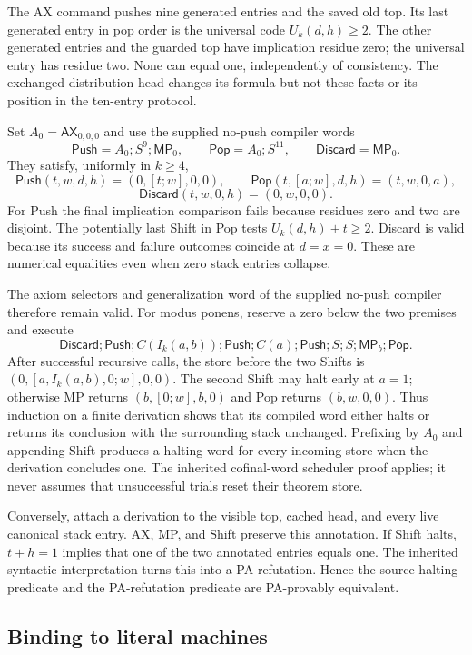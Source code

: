 The AX command pushes nine generated entries and the saved old top. Its last
generated entry in pop order is the universal code $U_k(d,h)\ge2$. The other
generated entries and the guarded top have implication residue zero; the
universal entry has residue two. None can equal one, independently of consistency.
The exchanged distribution head changes its formula but not these facts or its
position in the ten-entry protocol.

Set $A_0=\mathsf{AX}_{0,0,0}$ and use the supplied no-push compiler words
\[
 \mathsf{Push}=A_0;S^9;\mathsf{MP}_0,
 \qquad \mathsf{Pop}=A_0;S^{11},
 \qquad \mathsf{Discard}=\mathsf{MP}_0.
\]
They satisfy, uniformly in $k\ge4$,
\[
 \mathsf{Push}(t,w,d,h)=(0,[t;w],0,0),\qquad
 \mathsf{Pop}(t,[a;w],d,h)=(t,w,0,a),
\]
\[
 \mathsf{Discard}(t,w,0,h)=(0,w,0,0).
\]
For Push the final implication comparison fails because residues zero and two
are disjoint. The potentially last Shift in Pop tests $U_k(d,h)+t\ge2$.
Discard is valid because its success and failure outcomes coincide at $d=x=0$.
These are numerical equalities even when zero stack entries collapse.

The axiom selectors and generalization word of the supplied no-push compiler
therefore remain valid. For modus ponens, reserve a zero below the two premises
and execute
\[
 \mathsf{Discard};\mathsf{Push};C(I_k(a,b));\mathsf{Push};
 C(a);\mathsf{Push};S;S;\mathsf{MP}_b;\mathsf{Pop}.
\]
After successful recursive calls, the store before the two Shifts is
$(0,[a,I_k(a,b),0;w],0,0)$. The second Shift may halt early at $a=1$;
otherwise MP returns $(b,[0;w],b,0)$ and Pop returns $(b,w,0,0)$.
Thus induction on a finite derivation shows that its compiled word either
halts or returns its conclusion with the surrounding stack unchanged. Prefixing
by $A_0$ and appending Shift produces a halting word for every incoming store
when the derivation concludes one. The inherited cofinal-word scheduler proof
applies; it never assumes that unsuccessful trials reset their theorem store.

Conversely, attach a derivation to the visible top, cached head, and every live
canonical stack entry. AX, MP, and Shift preserve this annotation. If Shift
halts, $t+h=1$ implies that one of the two annotated entries equals one. The
inherited syntactic interpretation turns this into a PA refutation. Hence the
source halting predicate and the PA-refutation predicate are PA-provably equivalent.

\subsection{Binding to literal machines}

